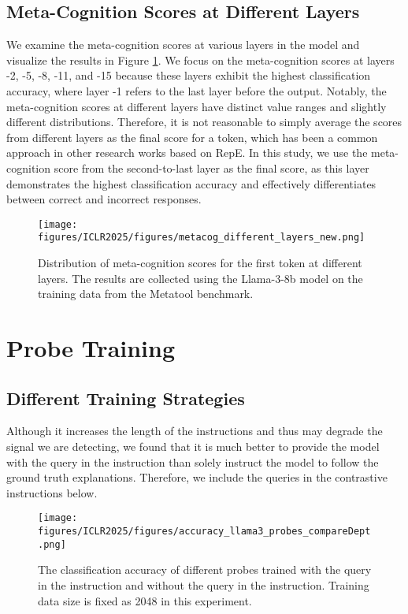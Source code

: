 \subsection{Meta-Cognition Scores at Different Layers} 
We examine the meta-cognition scores at various layers in the model and visualize the results in Figure \ref{fig:metacog_different_layer}. We focus on the meta-cognition scores at layers -2, -5, -8, -11, and -15 because these layers exhibit the highest classification accuracy, where layer -1 refers to the last layer before the output. Notably, the meta-cognition scores at different layers have distinct value ranges and slightly different distributions. Therefore, it is not reasonable to simply average the scores from different layers as the final score for a token, which has been a common approach in other research works based on RepE. In this study, we use the meta-cognition score from the second-to-last layer as the final score, as this layer demonstrates the highest classification accuracy and effectively differentiates between correct and incorrect responses.

\begin{figure}[ht]
  \centering
  \texttt{[image: figures/ICLR2025/figures/metacog\_different\_layers\_new.png]}
  \caption{Distribution of meta-cognition scores for the first token at different layers. The results are collected using the Llama-3-8b model on the training data from the Metatool benchmark.}
  \label{fig:metacog_different_layer}
\end{figure}






\clearpage
\section{Probe Training}\label{app:sec:probe}
\subsection{Different Training Strategies}
Although it increases the length of the instructions and thus may degrade the signal we are detecting, we found that it is much better to provide the model with the query in the instruction than solely instruct the model to follow the ground truth explanations. Therefore, we include the queries in the contrastive instructions below. 
\begin{figure}[ht]
  \centering
  \texttt{[image: figures/ICLR2025/figures/accuracy\_llama3\_probes\_compareDept.png]}
  \caption{The classification accuracy of different probes trained with the query in the instruction and without the query in the instruction. Training data size is fixed as 2048 in this experiment.}
  \label{fig:probes_accuracy_dept_vs_indept}
\end{figure}


